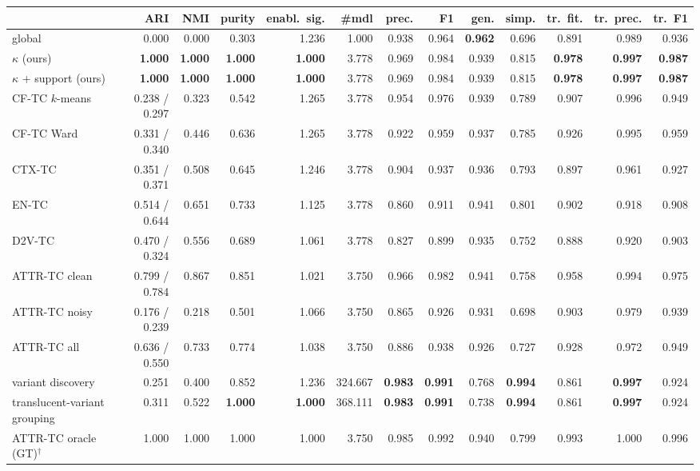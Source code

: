 \begin{tabular}{lrrrrrrrrrrrr}
\toprule
 & ARI & NMI & purity & enabl.\ sig. & \#mdl & prec. & F1 & gen. & simp. & tr.\ fit. & tr.\ prec. & tr.\ F1 \\
\midrule
global & 0.000 & 0.000 & 0.303 & 1.236 & 1.000 & 0.938 & 0.964 & \textbf{0.962} & 0.696 & 0.891 & 0.989 & 0.936 \\
$\kappa$ (ours) & \textbf{1.000} & \textbf{1.000} & \textbf{1.000} & \textbf{1.000} & 3.778 & 0.969 & 0.984 & 0.939 & 0.815 & \textbf{0.978} & \textbf{0.997} & \textbf{0.987} \\
$\kappa$ + support (ours) & \textbf{1.000} & \textbf{1.000} & \textbf{1.000} & \textbf{1.000} & 3.778 & 0.969 & 0.984 & 0.939 & 0.815 & \textbf{0.978} & \textbf{0.997} & \textbf{0.987} \\
CF-TC $k$-means & 0.238 / 0.297 & 0.323 & 0.542 & 1.265 & 3.778 & 0.954 & 0.976 & 0.939 & 0.789 & 0.907 & 0.996 & 0.949 \\
CF-TC Ward & 0.331 / 0.340 & 0.446 & 0.636 & 1.265 & 3.778 & 0.922 & 0.959 & 0.937 & 0.785 & 0.926 & 0.995 & 0.959 \\
CTX-TC & 0.351 / 0.371 & 0.508 & 0.645 & 1.246 & 3.778 & 0.904 & 0.937 & 0.936 & 0.793 & 0.897 & 0.961 & 0.927 \\
EN-TC & 0.514 / 0.644 & 0.651 & 0.733 & 1.125 & 3.778 & 0.860 & 0.911 & 0.941 & 0.801 & 0.902 & 0.918 & 0.908 \\
D2V-TC & 0.470 / 0.324 & 0.556 & 0.689 & 1.061 & 3.778 & 0.827 & 0.899 & 0.935 & 0.752 & 0.888 & 0.920 & 0.903 \\
ATTR-TC clean & 0.799 / 0.784 & 0.867 & 0.851 & 1.021 & 3.750 & 0.966 & 0.982 & 0.941 & 0.758 & 0.958 & 0.994 & 0.975 \\
ATTR-TC noisy & 0.176 / 0.239 & 0.218 & 0.501 & 1.066 & 3.750 & 0.865 & 0.926 & 0.931 & 0.698 & 0.903 & 0.979 & 0.939 \\
ATTR-TC all & 0.636 / 0.550 & 0.733 & 0.774 & 1.038 & 3.750 & 0.886 & 0.938 & 0.926 & 0.727 & 0.928 & 0.972 & 0.949 \\
variant discovery & 0.251 & 0.400 & 0.852 & 1.236 & 324.667 & \textbf{0.983} & \textbf{0.991} & 0.768 & \textbf{0.994} & 0.861 & \textbf{0.997} & 0.924 \\
translucent-variant grouping & 0.311 & 0.522 & \textbf{1.000} & \textbf{1.000} & 368.111 & \textbf{0.983} & \textbf{0.991} & 0.738 & \textbf{0.994} & 0.861 & \textbf{0.997} & 0.924 \\
ATTR-TC oracle (GT)$^{\dagger}$ & 1.000 & 1.000 & 1.000 & 1.000 & 3.750 & 0.985 & 0.992 & 0.940 & 0.799 & 0.993 & 1.000 & 0.996 \\
\bottomrule
\end{tabular}
